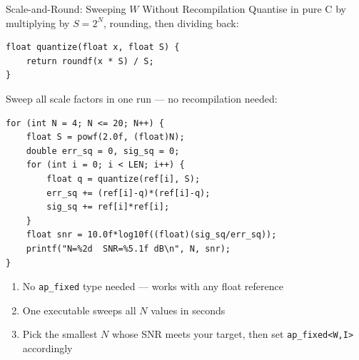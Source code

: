 \documentclass[aspectratio=169,12pt]{beamer}
\begin{document}
\begin{frame}[fragile]{Scale-and-Round: Sweeping $W$ Without Recompilation}
\vspace{0.02cm}
Quantise in pure C by multiplying by $S = 2^N$, rounding, then dividing back:
\begin{lstlisting}[basicstyle=\ttfamily\scriptsize,aboveskip=4pt,belowskip=4pt]
float quantize(float x, float S) {
    return roundf(x * S) / S;
}
\end{lstlisting}
Sweep all scale factors in one run --- no recompilation needed:
\begin{lstlisting}[basicstyle=\ttfamily\scriptsize,aboveskip=4pt,belowskip=4pt]
for (int N = 4; N <= 20; N++) {
    float S = powf(2.0f, (float)N);
    double err_sq = 0, sig_sq = 0;
    for (int i = 0; i < LEN; i++) {
        float q = quantize(ref[i], S);
        err_sq += (ref[i]-q)*(ref[i]-q);
        sig_sq += ref[i]*ref[i];
    }
    float snr = 10.0f*log10f((float)(sig_sq/err_sq));
    printf("N=%2d  SNR=%5.1f dB\n", N, snr);
}
\end{lstlisting}
\begin{enumerate}
  \item No \texttt{ap\_fixed} type needed --- works with any float reference
  \item One executable sweeps all $N$ values in seconds
  \item Pick the smallest $N$ whose SNR meets your target, then set \texttt{ap\_fixed<W,I>} accordingly
\end{enumerate}
\end{frame}
\end{document}
